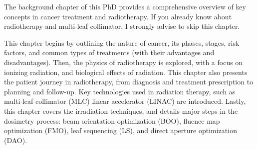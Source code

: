 The background chapter of this PhD provides a comprehensive overview of key concepts in cancer treatment and radiotherapy.
If you already know about radiotherapy and multi-leaf collimator, I strongly advise to skip this chapter.

This chapter begins by outlining the nature of cancer, its phases, stages, risk factors, and common types of treatments (with their advantages and disadvantages).
Then, the physics of radiotherapy is explored, with a focus on ionizing radiation, and biological effects of radiation.
This chapter also presents the patient journey in radiotherapy, from diagnosis and treatment prescription to planning and follow-up.
Key technologies used in radiation therapy, such as multi-leaf collimator (MLC) linear accelerator (LINAC) are introduced.
Lastly, this chapter covers the irradiation techniques, and details major steps in the dosimetry process:
beam orientation optimization (BOO), fluence map optimization (FMO), leaf sequencing (LS), and direct aperture optimization (DAO).
